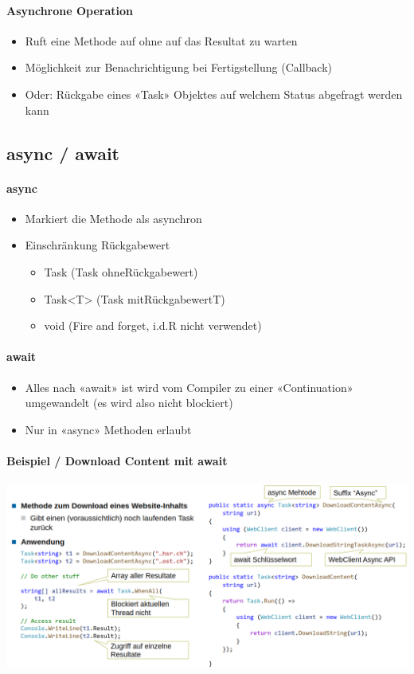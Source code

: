 \documentclass[
a4paper,
oneside,
10pt,
fleqn,
headsepline,
toc=listofnumbered, 
bibliography=totocnumbered]{scrartcl}
\begin{document}
\paragraph{Asynchrone Operation}
\begin{itemize}
	\item Ruft eine Methode auf ohne auf das Resultat zu warten
	\item Möglichkeit zur Benachrichtigung bei Fertigstellung (Callback)
	\item Oder: Rückgabe eines «Task» Objektes auf welchem Status abgefragt werden kann
\end{itemize}
\subsection{async / await}
\paragraph{async}
\begin{itemize}
	\item Markiert die Methode als asynchron
	\item Einschränkung Rückgabewert
	      \begin{itemize}
		      \item Task (Task ohneRückgabewert)
		      \item Task<T> (Task mitRückgabewertT)
		      \item void (Fire and forget, i.d.R nicht verwendet)
	      \end{itemize}
\end{itemize}
\paragraph{await}
\begin{itemize}
	\item Alles nach «await» ist wird vom Compiler zu einer «Continuation» umgewandelt (es wird also nicht blockiert)
	\item Nur in «async» Methoden erlaubt
\end{itemize}
\clearpage
\paragraph{Beispiel / Download Content mit await} \hfill
\newline


\begin{minipage}[t]{0.95\textwidth}
	\centering
	\includegraphics[width=0.95\linewidth]{images/beispiel-async-await.png}
\end{minipage}
\end{document}
